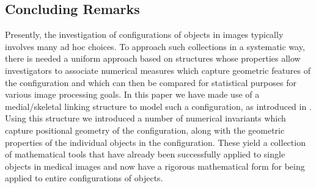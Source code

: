 \documentclass[10pt]{amsart}
\theoremstyle{definition}
\theoremstyle{definition}
\numberwithin{equation}{section}
\begin{document}
\subsection*{Concluding Remarks}
\par
Presently, the investigation of configurations of objects in images 
typically involves many ad hoc choices.  To approach such collections in a 
systematic way, there is needed a uniform approach based on structures 
whose properties allow investigators to associate numerical measures 
which capture geometric features of the configuration and which can then 
be compared for statistical purposes for various image processing goals.  
In this paper we have made use of a medial/skeletal linking structure to 
model such a configuration, as introduced in \cite{DG1}.  Using this 
structure we introduced a number of numerical invariants which capture 
positional geometry of the configuration, along with the geometric 
properties of the individual objects in the configuration.  These yield a 
collection of mathematical tools that have already been successfully 
applied to single objects in medical images and now have a rigorous 
mathematical form for being applied to entire configurations of objects.   
\end{document}
